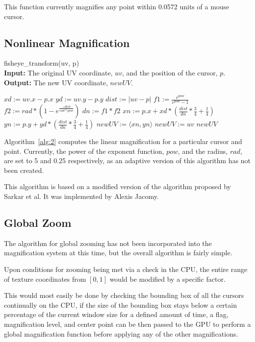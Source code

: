 \documentclass[annual]{acmsiggraph}
\begin{document}
This function currently magnifies any point within 0.0572 units of a mouse
cursor.

\subsection{Nonlinear Magnification}

\begin{algorithm}
\caption{fisheye\_transform(uv, p)\\
\textbf{Input:} The original UV coordinate, $uv$, and the position of the cursor, $p$. \\
\textbf{Output:} The new UV coordinate, $newUV$.}
\label{alg:2}
\begin{algorithmic}
    \State $xd := uv.x - p.x$
    \State $yd := uv.y - p.y$
    \State $dist := \left|uv - p\right|$
        \State $f1 := \frac{e^{pow}}{e^{pow}-1}$
        \State $f2 := rad * ( 1 - e^{ \frac{-dist}{rad * pow}})$
        \State $dn := f1 * f2$
        \State $xn := p.x + xd * ( \frac{dist}{dn} * \frac{3}{4} + \frac{1}{4} )$
        \State $yn := p.y + yd * ( \frac{dist}{dn} * \frac{3}{4} + \frac{1}{4} )$
        \State $newUV := \langle xn, yn \rangle$
    \Else
        \State $newUV := uv$
    \EndIf
    \State \Return $newUV$
\end{algorithmic}
\end{algorithm}
Algorithm~\ref{alg:2} computes the linear magnification for a 
particular cursor and point. Currently, the power of the exponent function,
$pow$, and the radius, $rad$, are set to 5 and 0.25 respectively, as an 
adaptive version of this algorithm has not been created.

This algorithm is based on a modified version of the algorithm proposed
by Sarkar et al. It was implemented by Alexis Jacomy. \cite{j12} 

\subsection{Global Zoom}
The algorithm for global zooming has not been incorporated into the 
magnification system at this time, but the overall algorithm is fairly
simple. 

Upon conditions for zooming being met via a check in the CPU, the entire
range of texture coordinates from $[0,1]$ would be modified by a specific
factor.

This would most easily be done by checking the bounding box of all the cursors
continually on the CPU, if the size of the bounding box stays below a certain
percentage of the current window size for a defined amount of time, a flag,
magnification level, and center point can be then passed to the GPU to perform
a global magnification function before applying any of the other magnifications.
\end{document}
